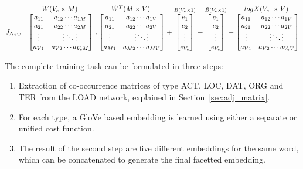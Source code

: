 \[J_{New } =\stackrel{\mbox{$W( V_{e}\times M)$ }}{%
    \begin{bmatrix}
    a_{11} & a_{12}  \cdots  a_{1M} \\
    a_{21} & a_{22}  \cdots  a_{2M} \\
    \vdots & \vdots  \ddots  \vdots \\
    a_{V1} & a_{V2}  \cdots  a_{V
_{e}M}
    \end{bmatrix}%
  } .
  \stackrel{\mbox{$\tilde{W}^T(M \times V)$ }}{%
    \begin{bmatrix}
    a_{11} & a_{12}  \cdots  a_{1V} \\
    a_{21} & a_{22} \cdots  a_{2V} \\
    \vdots & \vdots \ddots \vdots \\
    a_{M1} & a_{M2}  \cdots  a_{MV}
    \end{bmatrix}%
  } +
  \stackrel{B( V_{e}\times 1)}{%
    \begin{bmatrix}
    e_1 \\
    e_2 \\
    \vdots \\
    e_{V_{e}}
    \end{bmatrix}%
   }
   +
  \stackrel{\tilde{B}(V_{e}\times 1)}{%
    \begin{bmatrix}
    e_1 \\
    e_2 \\
    \vdots \\
    e_{V_{e}}
    \end{bmatrix}%
   }-
   \stackrel{\mbox{$logX( V_{e}\ \times V)$ }}{%
    \begin{bmatrix}
    a_{11} & a_{12}  \cdots  a_{1V} \\
    a_{21} & a_{22}  \cdots  a_{2V} \\
    \vdots & \vdots  \ddots  \vdots \\
    a_{V1} & a_{V2}  \cdots  a_{V_{e}V}
    \end{bmatrix}%
  }
\]

The complete training task can be formulated in three steps: 
 \begin{enumerate}        
 \item Extraction of co-occurrence matrices of type ACT, LOC, DAT, ORG and TER from the LOAD network, explained in Section~\ref{sec:adj_matrix}. 
 \item For each type, a GloVe based embedding is learned using either a separate or unified cost function. 
 \item The result of the second step are five different embeddings for the same word, which can be concatenated to generate the final facetted embedding. 
 \end{enumerate}
